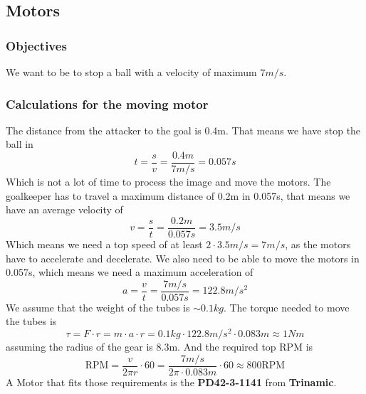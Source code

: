 \subsection{Motors}\label{subsec:motors}

\subsubsection{Objectives}\label{subsubsec:objectives}
We want to be to stop a ball with a velocity of maximum $7m/s$.

\subsubsection{Calculations for the moving motor}\label{subsubsec:moving_motor}
The distance from the attacker to the goal is 0.4m.
That means we have stop the ball in
\begin{equation}
    \label{eq:stopping_time}
    t = \frac{s}{v} = \frac{0.4m}{7m/s} = 0.057s
\end{equation}
Which is not a lot of time to process the image and move the motors.
The goalkeeper has to travel a maximum distance of 0.2m in 0.057s, that means we have an average velocity of
\begin{equation}
    \label{eq:average_velocity}
    v = \frac{s}{t} = \frac{0.2m}{0.057s} = 3.5m/s
\end{equation}
Which means we need a top speed of at least $2\cdot3.5m/s=7m/s$, as the motors have to accelerate and decelerate.
We also need to be able to move the motors in 0.057s, which means we need a maximum acceleration of
\begin{equation}
    \label{eq:acceleration}
    a = \frac{v}{t} = \frac{7m/s}{0.057s} = 122.8m/s^2
\end{equation}
We assume that the weight of the tubes is $\sim 0.1kg$.
The torque needed to move the tubes is
\begin{equation}
    \label{eq:torque}
    \tau = F \cdot r = m \cdot a \cdot r = 0.1kg \cdot 122.8m/s^2 \cdot 0.083m \approx 1Nm
\end{equation}
assuming the radius of the gear is 8.3m.
And the required top RPM is
\begin{equation}
    \label{eq:top_rpm}
    \text{RPM} = \frac{v}{2\pi r} \cdot 60 = \frac{7m/s}{2\pi \cdot 0.083m} \cdot 60 \approx 800\text{RPM}
\end{equation}
A Motor that fits those requirements is the \textbf{PD42-3-1141} from \textbf{Trinamic}.

